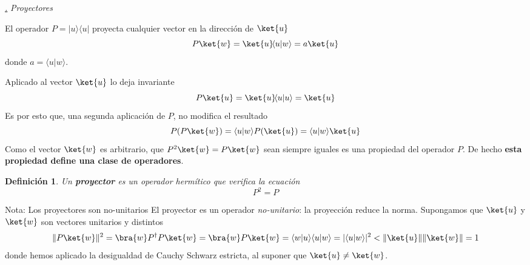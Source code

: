 \documentclass[a4paper,11pt]{book} %
\newtheorem{definicion_contador}{Definición}
\newcommand{\Definicion}[1]{
		\begin{mybox_gray2}{}
			\begin{definicion_contador}
				 #1 
			\end{definicion_contador} 
		\end{mybox_gray2}
	}
\numberwithin{equation}{chapter}
\newcommand{\braket}[2]{\langle #1|#2\rangle}
\newcommand{\ketbra}[2]{| #1\rangle \! \langle #2|}
\def\subsubiContadorIt{\par\addtocounter{subsubsection}{1}\underline{\it\thesubsubsection.}\hskip0.5cm \setcounter{subsubsubsectionIt}{0}}
\newcommand{\SubsubiIt}[1]{
		\subsubiContadorIt \textit{#1}
	}
\newcounter{subsubsubsectionIt}[subsubsection]
\begin{document}
			\SubsubiIt{Proyectores}


	El operador $P = \ketbra{u}{u}$ proyecta cualquier vector en la dirección de $\ket{u}$
	\begin{equation}
	P \ket{w} = \ket{u}\!\braket{u}{w} = a \ket{u}
	\end{equation}
donde $a = \braket{u}{w}$.

Aplicado al vector $\ket{u}$ lo deja invariante
	\begin{equation}
	P \ket{u} = \ket{u}\!\braket{u}{u} =  \ket{u}
	\end{equation}
Es por esto que, una segunda aplicación de $P$, no modifica el resultado
$$
P(P \ket{w}) =  \braket{u}{w} P(\ket{u}) = \braket{u}{w} \ket{u}
$$
Como el vector $\ket{w}$ es arbitrario, que $P^2\ket{w} = P\ket{w}$ sean siempre iguales es una propiedad del operador $P$. De hecho \textbf{esta propiedad define una clase de operadores}. 

	\Definicion{
	Un \textbf{proyector }es un operador hermítico que verifica la ecuación
$$
P^2 = P
$$
	}

\begin{mybox_blue}{Nota: Los proyectores son no-unitarios}
El proyector es un operador \textit{no-unitario}: la proyección reduce la norma.
Supongamos que $\ket{u}$ y $\ket{w}$ son vectores unitarios y distintos
	\begin{equation}
	\| P\ket{w}\|^2 = \bra{w}P^\dagger P\ket{w} = \bra{w} P\ket{w}= \braket{w}{u}\braket{u}{w} = |\braket{u}{w}|^2 < \|\ket{u}\|\|\ket{w}\| = 1  
	\end{equation}
donde hemos aplicado la desigualdad de Cauchy Schwarz estricta, al suponer que $\ket{u}\neq\ket{w}$.
\end{mybox_blue}
\end{document}
